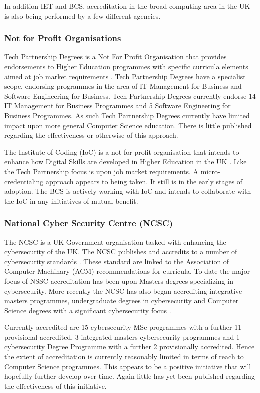 \documentclass[sigconf]{acmart}
\begin{document}
In addition IET and BCS, accreditation in the broad computing area in the UK is also being performed by a few different agencies. 

\subsubsection{Not for Profit Organisations}
Tech Partnership Degrees is a Not For Profit Organisation that provides endorsements to Higher Education programmes with specific curricula elements aimed at job market requirements \cite{TP2019}. Tech Partnership Degrees have a specialist scope, endorsing programmes in the area of IT Management for Business and Software Engineering for Business.  Tech Partnership Degrees currently endorse 14 IT Management for Business Programmes and 5 Software Engineering for Business Programmes. As such Tech Partnership Degrees currently have limited impact upon more general Computer Science education. There is little published regarding the effectiveness or otherwise of this approach.

The Institute of Coding (IoC) is a not for profit organisation that intends to enhance how Digital Skills are developed in Higher Education in the UK \cite{Davenportetal2019a}. Like the Tech Partnership focus is upon job market requirements. A micro-credentialing approach appears to being taken. It still is in the early stages of adoption. The BCS is actively working with IoC and intends to collaborate with the IoC in any initiatives of mutual benefit.

\subsubsection{National Cyber Security Centre (NCSC)}
The NCSC is a UK Government organisation tasked with enhancing the cybersecurity of the UK. The NCSC publishes and accredits to a number of cybersecurity standards \cite{NCSC2018a}. These standard are linked to the Association of Computer Machinary (ACM) recommendations for curricula. To date the major focus of NSSC accreditation has been upon Masters degrees specializing in cybersecurity. More recently the NCSC has also began accrediting integrative masters programmes, undergraduate degrees in cybersecurity and Computer Science degrees with a significant cybersecurity focus \cite{NCSC2018b}.

Currently accredited are 15 cybersecurity MSc programmes with a further 11 provisional accredited, 3 integrated masters cybersecurity programmes and 1 cybersecurity Degree Programme with a further 2 provisionally accredited. Hence the extent of accreditation is currently reasonably limited in terms of reach to Computer Science programmes. This appears to be a positive initiative that will hopefully further develop over time. Again little has yet been published regarding the effectiveness of this initiative.
\end{document}
